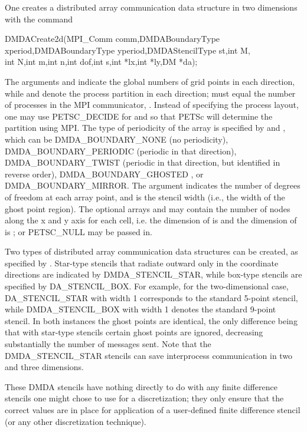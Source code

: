 One creates a distributed array communication data structure
in two dimensions with the command
\begin{tabbing}
  DMDACreate2d(MPI\_Comm comm,DMDABoundaryType xperiod,DMDABoundaryType yperiod,DMDAStencilType st,int M,\\
             int N,int m,int n,int dof,int s,int *lx,int *ly,DM *da);
\end{tabbing}
The   arguments
  and  indicate the global
numbers of grid points in each direction, while  and 
denote the process partition in each direction;  must equal
the number of processes in the MPI communicator, .
Instead of specifying the process layout, one may use
PETSC\_DECIDE for  and 
so that PETSc will determine the partition using MPI. The type of
periodicity of the array is specified by  and , which can be
DMDA\_BOUNDARY\_NONE  (no periodicity),
DMDA\_BOUNDARY\_PERIODIC  (periodic in that direction),
DMDA\_BOUNDARY\_TWIST  (periodic in that direction, but identified in reverse order),
DMDA\_BOUNDARY\_GHOSTED ,
or DMDA\_BOUNDARY\_MIRROR.  The argument 
indicates the number of degrees of freedom at each array point,
and  is the stencil width (i.e., the width of the ghost point region).
The optional arrays  and  may contain the number of nodes
along the x and y axis for each cell, i.e. the dimension of  is
 and the dimension of  is ; or PETSC\_NULL
may be passed in.

Two types of distributed array communication data structures
can be created, as specified by .
Star-type stencils that radiate outward only in the coordinate
directions are indicated by DMDA\_STENCIL\_STAR,
while box-type stencils are specified by
DA\_STENCIL\_BOX. For example, for the
two-dimensional case,
DA\_STENCIL\_STAR with width 1 corresponds to the standard 5-point
stencil, while DMDA\_STENCIL\_BOX with width 1 denotes the
standard 9-point stencil.  In both instances the ghost points are
identical, the only difference being that with star-type stencils
certain ghost points are ignored, decreasing substantially
the number of messages sent.  Note that the DMDA\_STENCIL\_STAR
stencils can save interprocess communication in two and three
dimensions.

These DMDA stencils have nothing directly to do with any finite
difference stencils one might chose to use for a discretization; they
only ensure that the correct values are in place for application of a
user-defined finite difference stencil (or any other
discretization technique).

